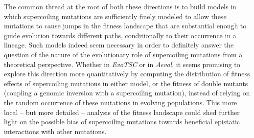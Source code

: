 The common thread at the root of both these directions is to build models in which supercoiling mutations are sufficiently finely modeled to allow these mutations to cause jumps in the fitness landscape that are substantial enough to guide evolution towards different paths, conditionally to their occurrence in a lineage.
Such models indeed seem necessary in order to definitely answer the question of the nature of the evolutionary role of supercoiling mutations from a theoretical perspective.
Whether in \emph{EvoTSC} or in \emph{Aevol}, it seems promising to explore this direction more quantitatively by computing the distribution of fitness effects of supercoiling mutations in either model, or the fitness of double mutants (coupling a genomic inversion with a supercoiling mutation), instead of relying on the random occurrence of these mutations in evolving populations.
This more local -- but more detailed -- analysis of the fitness landscape could shed further light on the possible bias of supercoiling mutations towards beneficial epistatic interactions with other mutations.


